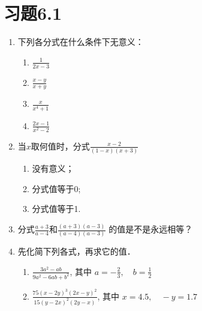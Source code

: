 \section*{习题6.1}
\begin{enumerate}
    \item 下列各分式在什么条件下无意义：
 \begin{multicols}{2}
 \begin{enumerate}
     \item $\frac{1}{2x-3}$
     \item $\frac{x-y}{x+y}$
     \item $\frac{x}{x^4+1}$
     \item $\frac{2x-1}{x^2-2}$
 \end{enumerate}
 \end{multicols}
    \item 当$x$取何值时，分式$\frac{x-2}{(1-x)(x+3)}$
    \begin{enumerate}
        \item 没有意义；
        \item 分式值等于0;
        \item 分式值等于1.
    \end{enumerate}
\item 分式$\frac{a+3}{a-4}$和$\frac{(a+3)(a-3)}{(a-4)(a-3)}$
的值是不是永远相等？
\item 先化简下列各式，再求它的值．
\begin{enumerate}
    \item $\frac{3 a^{2}-a b}{9 a^{2}-6 a b+b^{2}}$, 其中 $a=- \frac{2}{3}, \quad b=\frac{1}{2}$
    \item  $\frac{75(x-2 y)^{3}(2 x-y)^{2}}{15(y-2 x)^{2}(2 y-x)}$, 其中 $x=4.5,\quad -y=1.7$
\end{enumerate}


\end{enumerate}
